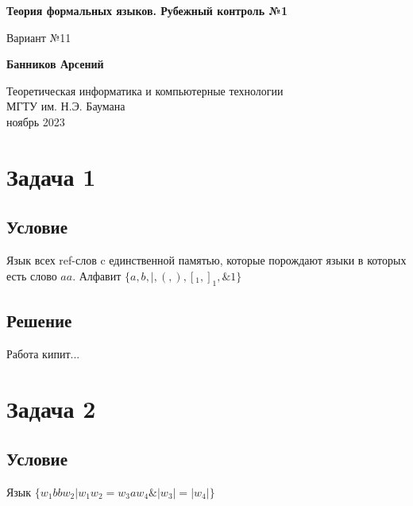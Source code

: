 \documentclass[a4paper, 14pt]{extarticle}
\begin{document}
\begin{titlepage}
  \begin{center}
    \vspace*{1cm}

    \Huge
    \textbf{Теория формальных языков. Рубежный контроль №1}

    \vspace{0.5cm}
    \Large
    Вариант №11

    \vspace{1.5cm}

    \textbf{Банников Арсений}

    \vfill

    \vspace{0.8cm}

    \Large
    Теоретическая информатика и компьютерные технологии\\
    МГТУ им. Н.Э. Баумана\\
    ноябрь 2023

  \end{center}
\end{titlepage}

\newpage

\tableofcontents

\newpage

\section{Задача 1}

\subsection{Условие}
Язык всех ref-слов c единственной памятью, которые порождают языки в которых есть слово $aa$. Алфавит $\{a, b, \mid, (, ), [_1, ]_1, \&1\}$

\subsection{Решение}
Работа кипит...

\newpage

\section{Задача 2}

\subsection{Условие}
Язык $\Biggl\{ w_1bbw_2 \mathbin{\Bigg|} w_1w_2 = w_3aw_4 \mathbin{\&} |w_3| = |w_4| \Biggr\}$
\end{document}
